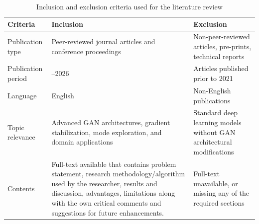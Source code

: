 \documentclass[12pt,a4paper]{article}
\begin{document}
\begin{table}[H]
\caption{Inclusion and exclusion criteria used for the literature review}
\label{tab:inclusion-exclusion}

\fontsize{10pt}{12pt}\selectfont

\begin{tabular}{|p{2.7cm}|p{8cm}|p{4cm}|}
\hline
\centering\textbf{Criteria} &
\centering\textbf{Inclusion} &
\centering\textbf{Exclusion}
\tabularnewline
\hline

\centering Publication type &
\centering Peer-reviewed journal articles and conference proceedings &
\centering Non-peer-reviewed articles, pre-prints, technical reports
\tabularnewline
\hline

\centering Publication period &
\centering 2021--2026 &
\centering Articles published prior to 2021
\tabularnewline
\hline

\centering Language &
\centering English &
\centering Non-English publications
\tabularnewline
\hline

\centering Topic relevance &
\centering Advanced GAN architectures, gradient stabilization, mode exploration, and domain applications &
\centering Standard deep learning models without GAN architectural modifications
\tabularnewline
\hline

\centering Contents &
\centering Full-text available that contains problem statement, research
methodology/algorithm used by the researcher, results and discussion, advantages, limitations along with the own critical comments and suggestions for future enhancements.
 &
\centering Full-text unavailable, or missing any of the required sections
\tabularnewline
\hline

\end{tabular}

\end{table}





\end{document}
